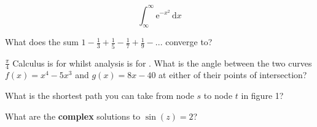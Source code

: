 \documentclass[12pt,twoside,addpoints]{exam}
\makeatletter
\renewenvironment{solutionordottedlines}[1][]
  {%
   \def\@tempa{#1}%
   \expandafter\comment
  }
  {%
   \expandafter\endcomment
  }
\makeatother
\begin{document}
\begin{questions}
    \question[3] \[\int^\infty_\infty \mathrm{e}^{-x^2} \,\mathrm{d}x\]
        \begin{solutionordottedlines}[1.5in]
        \end{solutionordottedlines}
    \question[2] What does the sum $1 - \frac{1}{3} + \frac{1}{5} - \frac{1}{7} + \frac{1}{9} - ...$ converge to?
        \begin{solutionordottedlines}[1in]
            $\frac{\pi}{4}$
        \end{solutionordottedlines}
    \question[1] Calculus is for \fillin[children] whilst analysis is for \fillin[adults].
    \question[2] What is the angle between the two curves $f(x) = x^4 -5x^3$ and $g(x) = 8x-40$ at either of their points of intersection?
        \begin{solutionordottedlines}[1in]
        \end{solutionordottedlines}
    \question[2] What is the shortest path you can take from node $s$ to node $t$ in figure 1?
        \begin{solutionordottedlines}[1in]
        \end{solutionordottedlines}
    \question[2] What are the \textbf{complex} solutions to $\sin(z) = 2$?
        \begin{solutionordottedlines}[1in]
        \end{solutionordottedlines}
    \question
\end{questions}
\end{document}
